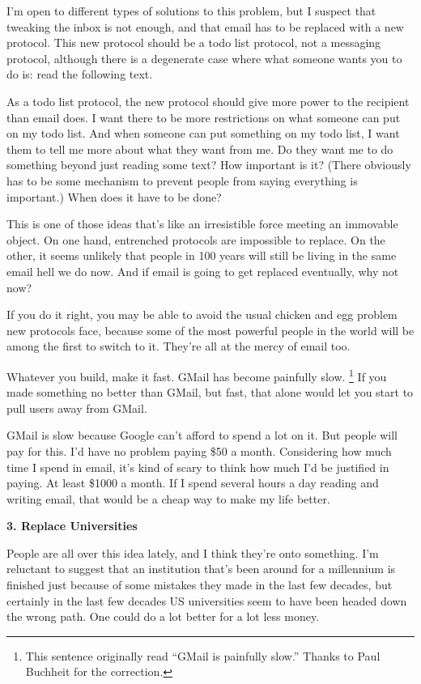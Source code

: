 I'm open to different types of solutions to this problem, but I suspect
that tweaking the inbox is not enough, and that email has to be replaced
with a new protocol. This new protocol should be a todo list protocol,
not a messaging protocol, although there is a degenerate case where what
someone wants you to do is: read the following text.

As a todo list protocol, the new protocol should give more power to the
recipient than email does. I want there to be more restrictions on what
someone can put on my todo list. And when someone can put something on
my todo list, I want them to tell me more about what they want from me.
Do they want me to do something beyond just reading some text? How
important is it? (There obviously has to be some mechanism to prevent
people from saying everything is important.) When does it have to be
done?

This is one of those ideas that's like an irresistible force meeting an
immovable object. On one hand, entrenched protocols are impossible to
replace. On the other, it seems unlikely that people in 100 years will
still be living in the same email hell we do now. And if email is going
to get replaced eventually, why not now?

If you do it right, you may be able to avoid the usual chicken and egg
problem new protocols face, because some of the most powerful people in
the world will be among the first to switch to it. They're all at the
mercy of email too.

Whatever you build, make it fast. GMail has become painfully slow.
\footnote{This sentence originally read ``GMail is painfully slow.''
Thanks to Paul Buchheit for the correction.} If you made something no better than GMail, but
fast, that alone would let you start to pull users away from GMail.

GMail is slow because Google can't afford to spend a lot on it. But
people will pay for this. I'd have no problem paying \$50 a month.
Considering how much time I spend in email, it's kind of scary to think
how much I'd be justified in paying. At least \$1000 a month. If I spend
several hours a day reading and writing email, that would be a cheap way
to make my life better.

\textbf{3. Replace Universities}

People are all over this idea lately, and I think they're onto
something. I'm reluctant to suggest that an institution that's been
around for a millennium is finished just because of some mistakes they
made in the last few decades, but certainly in the last few decades US
universities seem to have been headed down the wrong path. One could do
a lot better for a lot less money.

